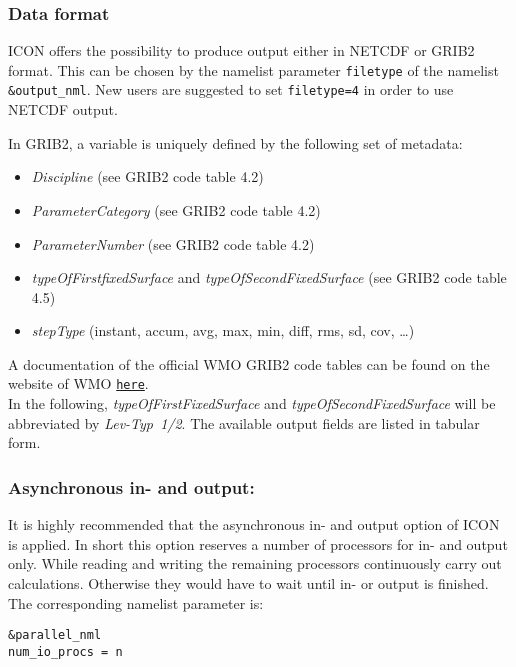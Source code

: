  

\subsubsection{Data format}


ICON offers the possibility to produce output either in NETCDF or GRIB2 format. This can be chosen by the namelist parameter \verb+filetype+ of the namelist \verb+&output_nml+. New users are suggested to set \verb+filetype=4+ in order to use NETCDF output.

In GRIB2, a variable is uniquely defined by the following set of metadata:
\begin{itemize}
 \item \textit{Discipline} (see GRIB2 code table 4.2)
 \item \textit{ParameterCategory} (see GRIB2 code table 4.2)
 \item \textit{ParameterNumber} (see GRIB2 code table 4.2)
 \item \textit{typeOfFirstfixedSurface} and \textit{typeOfSecondFixedSurface} (see GRIB2 code table 4.5)
 \item \textit{stepType} (instant, accum, avg, max, min, diff, rms, sd, cov, \dots)
\end{itemize}
A documentation of the official WMO GRIB2 code tables can be found on the website of WMO \href{http://www.wmo.int/pages/prog/www/WMOCodes/WMO306_vI2/LatestVERSION/WMO306_vI2_GRIB2_CodeFlag_en.pdf} {\tt here}.\\
In the following, \textit{typeOfFirstFixedSurface} and \textit{typeOfSecondFixedSurface} will be abbreviated by \textit{Lev-Typ~1/2}. The available output fields are listed in tabular form.


\subsubsection*{Asynchronous in- and  output:} 

It is highly recommended that the asynchronous in- and output option of ICON is applied. In short this option reserves a number of processors for in- and output only.  While reading and writing the remaining processors continuously carry out calculations. Otherwise they would have to wait until in- or output is finished. The corresponding namelist parameter is:

\begin{verbatim}
&parallel_nml
num_io_procs = n
\end{verbatim} 

